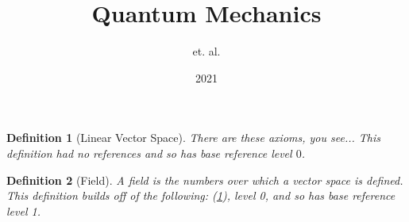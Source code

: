 \documentclass{article}
\title{Quantum Mechanics}
\author{et. al.}
\date{2021}
\newtheorem{definition}{Definition}
\begin{document}
\maketitle

\begin{definition}[Linear Vector Space]
\label{0}
There are these axioms, you see...
This definition had no references and so has base reference level $0$.
\end{definition}
\begin{definition}[Field]
\label{1}
A field is the numbers over which a vector space is defined.
This definition builds off of the following: 
(\ref{0}), level 0, 
and so has base reference level 1.
\end{definition}
\end{document}

